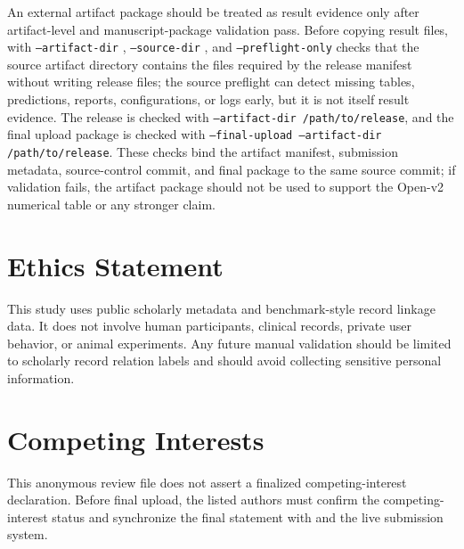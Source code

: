 \documentclass[11pt]{article}
\begin{document}
\begin{sloppypar}
An external artifact package should be treated as result evidence only after artifact-level and manuscript-package validation pass. Before copying result files,  with \texttt{--artifact-dir} , \texttt{--source-dir} , and \texttt{--preflight-only} checks that the source artifact directory contains the files required by the release manifest without writing release files; the source preflight can detect missing tables, predictions, reports, configurations, or logs early, but it is not itself result evidence. The release is checked with  \texttt{--artifact-dir /path/to/release}, and the final upload package is checked with  \texttt{--final-upload --artifact-dir /path/to/release}. These checks bind the artifact manifest, submission metadata, source-control commit, and final package to the same source commit; if validation fails, the artifact package should not be used to support the Open-v2 numerical table or any stronger claim.

\end{sloppypar}

\section*{Ethics Statement}

This study uses public scholarly metadata and benchmark-style record linkage data. It does not involve human participants, clinical records, private user behavior, or animal experiments. Any future manual validation should be limited to scholarly record relation labels and should avoid collecting sensitive personal information.

\section*{Competing Interests}

This anonymous review file does not assert a finalized competing-interest declaration. Before final upload, the listed authors must confirm the competing-interest status and synchronize the final statement with  and the live submission system.



\end{document}
